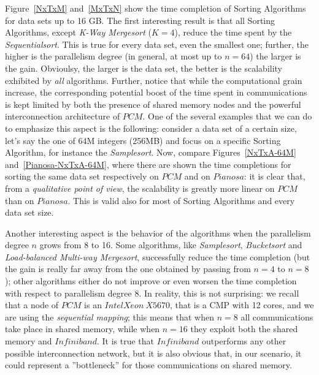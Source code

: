 Figure~\ref{NxTxM} and~\ref{MxTxN} show the time completion of Sorting Algorithms for data sets up to 16 GB. The first interesting result is that all Sorting Algorithms, except \textit{K-Way Mergesort} ($K=4$), reduce the time spent by the \textit{Sequentialsort}. This is true for every data set, even the smallest one; further, the higher is the parallelism degree (in general, at most up to $n=64$) the larger is the gain. Obvioulsy, the larger is the data set, the better is the scalability exhibited by \textit{all} algorithms. Further, notice that while the computational grain increase, the corresponding potential boost of the time spent in communications is kept limited by both the presence of shared memory nodes and the powerful interconnection architecture of $PCM$. One of the several examples that we can do to emphasize this aspect is the following: consider a data set of a certain size, let's say the one of 64M integers (256MB) and focus on a specific Sorting Algorithm, for instance the \textit{Samplesort}. Now, compare Figures~\ref{NxTxA-64M} and~\ref{Pianosa-NxTxA-64M}, where there are shown the time completions for sorting the same data set respectively on $PCM$ and on $Pianosa$: it is clear that, from a \textit{qualitative point of view}, the scalability is greatly more linear on $PCM$ than on $Pianosa$. This is valid also for most of Sorting Algorithms and every data set size. 

Another interesting aspect is the behavior of the algorithms when the parallelism degree $n$ grows from 8 to 16. Some algorithms, like \textit{Samplesort}, \textit{Bucketsort} and \textit{Load-balanced Multi-way Mergesort}, successfully reduce the time completion (but the gain is really far away from the one obtained by passing from $n=4$ to $n=8$); other algorithms either do not improve or even worsen the time completion with respect to parallelism degree 8. In reality, this is not surprising: we recall that a node of $PCM$ is an $IntelXeon\ X5670$, that is a CMP with 12 cores, and we are using the \textit{sequential mapping}; this means that when $n=8$ all communications take place in shared memory, while when $n=16$ they exploit both the shared memory and $Infiniband$. It is true that $Infiniband$ outperforms any other possible interconnection network, but it is also obvious that, in our scenario, it could represent a ''bottleneck'' for those communications on shared memory. 




